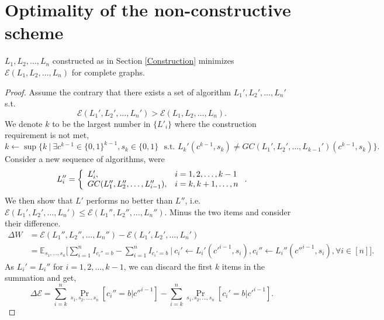 \documentclass[a4paper,UKenglish]{lipics}
\theoremstyle{definition}
\begin{document}
\section{Optimality of the non-constructive scheme}
\label{proofGC}

$L_1, L_2, \dots, L_n$ constructed as in Section \ref{Construction} minimizes $\mathcal{E}(L_1, L_2, \dots, L_n)$ for complete graphs.

\begin{proof}
Assume the contrary that there exists a set of algorithm $L_1', L_2', \dots, L_n'$ s.t. 
\begin{equation*} 
	\mathcal{E}(L_1', L_2', \dots, L_n') 
	> 
	\mathcal{E}(L_1, L_2, \dots, L_n). 
\end{equation*}
We denote $k$ to be the largest number in $\{L'_i\}$ where the construction requirement is not met,
\begin{equation*}
	k 
\gets 
	\sup \Big\{ 
		k 
		~\Big|~ 
		\exists c^{k-1} \in \{0,1\}^{k-1}, s_k\in \{0,1\} 
		\text{ ~s.t.~} 
		L_k'(c^{k-1}, s_k) \not= GC(L_1', L_2', \dots, L_{k-1}')(c^{k-1}, s_k)
	\Big\}.
\end{equation*}
Consider a new sequence of algorithms, were
\begin{equation*}
	L_i'' 
	= 
	\left\{ 
		\begin{array}{l l}
			L_i', & i=1,2,\dots,k-1  \\
			GC(L_1'', L_2'', \dots, L_{i-1}''), & i=k,k+1,\dots,n
		\end{array}
	\right..
\end{equation*}
We then show that $L'$ performs no better than $L''$, i.e.
$
	\mathcal{E}(L_1', L_2', \dots, L_n')
	\leq 
	\mathcal{E}(L_1'', L_2'', \dots, L_n'').
$
Minus the two items and consider their difference.
\begin{align*}
	\Delta W
& = 
	\mathcal{E}(L_1'', L_2'', \dots, L_n'') - \mathcal{E}(L_1', L_2', \dots, L_n') 
\\
& = 
	\mathbb E_{s_1, \dots, s_n} \Big[ 
		\sum_{i=1}^n I_{c_i''=b} - \sum_{i=1}^n I_{c_i'=b} 
		~\Big|~
		c_i' \gets L_i'(c'^{i-1}, s_i), 
		c_i'' \gets L_i''(c''^{i-1}, s_i), \forall i \in [n] 
	\Big].
\end{align*}
As $L_i'=L_i''$ for $i=1,2,\dots,k-1$, we can discard the first $k$ items in the summation and get,
\begin{equation*}
	\Delta \mathcal{E} 
=
	\sum_{i=k}^n \Pr_{s_1, s_2, \dots, s_n} [c_i'' = b|c''^{i-1}] - 
	\sum_{i=k}^n \Pr_{s_1, s_2, \dots, s_n} [c_i' = b|c'^{i-1}].
\end{equation*}

\end{proof}
\end{document}
